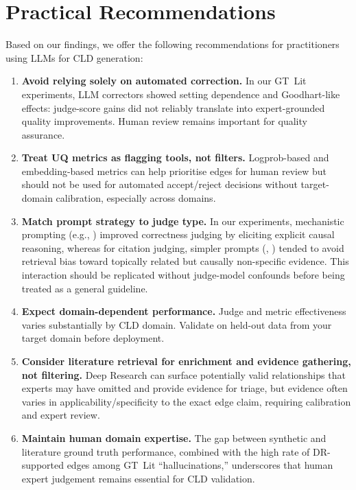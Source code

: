 \section{Practical Recommendations}
\label{sec:discussion_recommendations}

Based on our findings, we offer the following recommendations for practitioners using LLMs for CLD generation:

\begin{enumerate}
    \item \textbf{Avoid relying solely on automated correction.} In our GT~Lit experiments, LLM correctors showed setting dependence and Goodhart-like effects: judge-score gains did not reliably translate into expert-grounded quality improvements. Human review remains important for quality assurance.
    
    \item \textbf{Treat UQ metrics as flagging tools, not filters.} Logprob-based and embedding-based metrics can help prioritise edges for human review but should not be used for automated accept/reject decisions without target-domain calibration, especially across domains.
    
    \item \textbf{Match prompt strategy to judge type.} In our experiments, mechanistic prompting (e.g., \PromptMechanistic{}) improved correctness judging by eliciting explicit causal reasoning, whereas for citation judging, simpler prompts (\PromptBaseline{}, \PromptCoT{}) tended to avoid retrieval bias toward topically related but causally non-specific evidence. This interaction should be replicated without judge-model confounds before being treated as a general guideline.
    
    \item \textbf{Expect domain-dependent performance.} Judge and metric effectiveness varies substantially by CLD domain. Validate on held-out data from your target domain before deployment.
    
    \item \textbf{Consider literature retrieval for enrichment and evidence gathering, not filtering.} Deep Research can surface potentially valid relationships that experts may have omitted and provide evidence for triage, but evidence often varies in applicability/specificity to the exact edge claim, requiring calibration and expert review.
    
    \item \textbf{Maintain human domain expertise.} The gap between synthetic and literature ground truth performance, combined with the high rate of DR-supported edges among GT~Lit ``hallucinations,'' underscores that human expert judgement remains essential for CLD validation.
\end{enumerate}

